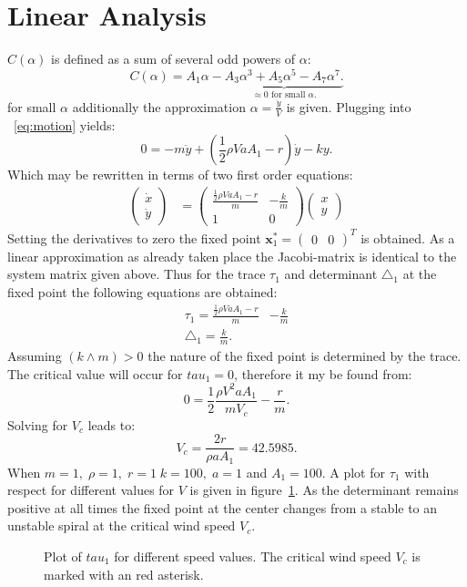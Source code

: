 \section{Linear Analysis}
$C(\alpha)$ is defined as a sum of several odd powers of $\alpha$:
\begin{equation}
C(\alpha) = A_1 \alpha - \underbrace{ A_3 \alpha^3 + A_ 5 \alpha ^5 - A_7 \alpha^7.}_\text{$\approx 0$ for small $\alpha$.} 
\end{equation}
for small $\alpha$ additionally the approximation $\alpha = \frac{\dot{y}}{V}$ is given. Plugging into ~\ref{eq:motion} yields:
\begin{equation}
0 = -m \ddot{y} + (\frac{1}{2}\rho V a A_1 -  r)\dot{y} - ky. 
\label{eq:linear}
\end{equation}
Which may be rewritten in terms of two first order equations:
\begin{align}
\begin{pmatrix}
\dot{x} \\ \dot{y} \end{pmatrix} &=
\begin{pmatrix}
	\frac{\frac{1}{2}\rho V a A_1 -  r}{m} & - \frac{k}{m}  \\ 
	1 & 0
\end{pmatrix} 
\begin{pmatrix}
x \\ y
\end{pmatrix}
\label{eq:linSys}
\end{align}
Setting the derivatives to zero the fixed point $\mathbf{x}_1^* = \begin{pmatrix} 0 & 0 \end{pmatrix}^T$ is obtained. As a linear approximation as already taken place the Jacobi-matrix is identical to the system matrix given above. Thus for the trace $\tau_1$ and determinant $\triangle_1$ at the fixed point the following equations are obtained:
\begin{align}
\tau_1 = \frac{\frac{1}{2}\rho V a A_1 -  r}{m} & - \frac{k}{m} \\
\triangle_1 = \frac{k}{m}.
\end{align}
Assuming $(k \wedge m) > 0$ the nature of the fixed point is determined by the trace. The critical value will occur for $tau_1 = 0$, therefore it my be found from:
\begin{equation}
0 = \frac{1}{2} \frac{\rho V^2 a A_1}{mV_c} - \frac{r}{m}.
\end{equation}
Solving for $V_c$ leads to:
\begin{equation}
V_c = \frac{2r}{\rho a A_1} = 42.5985.
\label{eq:devVc}
\end{equation}
When $m = 1, \; \rho = 1, \; r = 1 \; k = 100, \; a = 1$ and $A_1 = 100$. 
A plot for $\tau_1$ with respect for different values for $V$ is given in figure~\ref{fig:tau1}. As the determinant remains positive at all times the fixed point at the center changes from a stable to an unstable spiral at the critical wind speed $V_c$. 
\begin{figure}

\caption{Plot of $tau_1$ for different speed values. The critical wind speed $V_c$ is marked with an red asterisk.}
\label{fig:tau1}
\end{figure}

